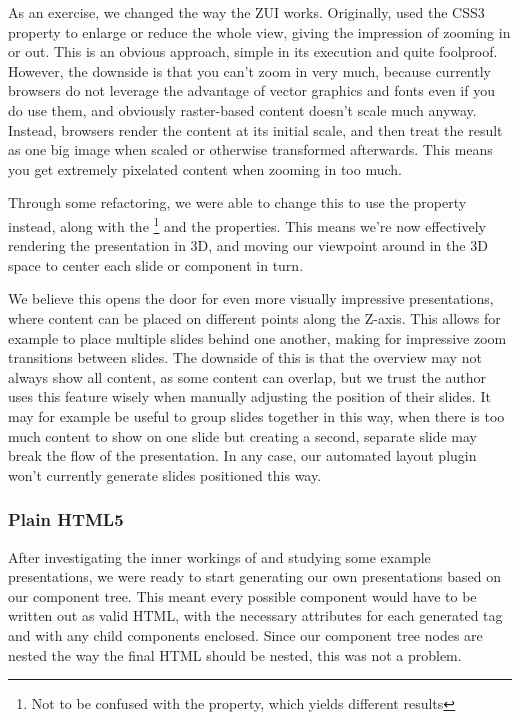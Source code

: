     As an exercise, we changed the way the ZUI works. Originally, \mxp used
     the CSS3  property to enlarge or reduce the whole
     view, giving the impression of zooming in or out. This is an obvious
     approach, simple in its execution and quite foolproof. However, the
     downside is that you can't zoom in very much, because currently browsers
     do not leverage the advantage of vector graphics and fonts even if you do
     use them, and obviously raster-based content doesn't scale much anyway.
     Instead, browsers render the content at its initial scale, and then treat
     the result as one big image when scaled or otherwise transformed
     afterwards. This means you get extremely pixelated content when zooming in
     too much.

     Through some refactoring, we were able to change this to use the
      property instead, along with the
     \footnote{Not to be confused with the
      property, which yields different results}
     and the  properties. This means we're
     now effectively rendering the presentation in 3D, and moving our viewpoint
     around in the 3D space to center each slide or component in turn.

     We believe this opens the door for even more visually impressive
     presentations, where content can be placed on different points along the
     Z-axis. This allows for example to place multiple slides behind one
     another, making for impressive zoom transitions between slides. The
     downside of this is that the overview may not always show all content, as
     some content can overlap, but we trust the author uses this feature wisely
     when manually adjusting the position of their slides. It may for example
     be useful to group slides together in this way, when there is too much
     content to show on one slide but creating a second, separate slide may
     break the flow of the presentation. In any case, our automated layout
     plugin won't currently generate slides positioned this way.

    \subsubsection{Plain HTML5}

     After investigating the inner workings of \mxp and studying some example
     presentations, we were ready to start generating our own presentations
     based on our component tree. This meant every possible component would
     have to be written out as valid HTML, with the necessary attributes for
     each generated tag and with any child components enclosed. Since our
     component tree nodes are nested the way the final HTML should be nested,
     this was not a problem.

